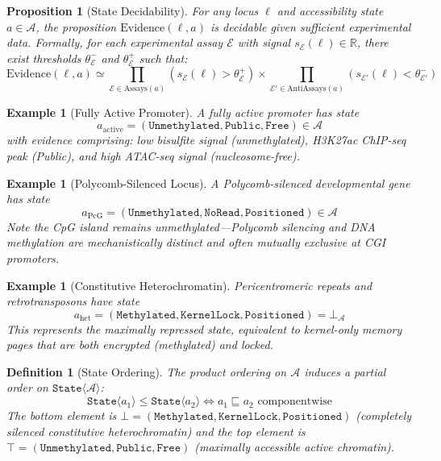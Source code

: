 \documentclass[12pt,a4paper]{article}
\newtheorem{proposition}[theorem]{Proposition}
\newtheorem{definition}[theorem]{Definition}
\newtheorem{example}[theorem]{Example}
\newcommand{\Meth}{\texttt{Methylated}}
\newcommand{\Unmeth}{\texttt{Unmethylated}}
\newcommand{\StateT}{\texttt{State}}
\begin{document}
\begin{proposition}[State Decidability]
\label{prop:state-decide}
For any locus $\ell$ and accessibility state $a \in \mathcal{A}$, the proposition $\mathrm{Evidence}(\ell, a)$ is decidable given sufficient experimental data. Formally, for each experimental assay $\mathcal{E}$ with signal $s_{\mathcal{E}}(\ell) \in \mathbb{R}$, there exist thresholds $\theta_{\mathcal{E}}^-$ and $\theta_{\mathcal{E}}^+$ such that:
\[
    \mathrm{Evidence}(\ell, a) \simeq \prod_{\mathcal{E} \in \mathrm{Assays}(a)} \left(s_{\mathcal{E}}(\ell) > \theta_{\mathcal{E}}^+\right) \times \prod_{\mathcal{E}' \in \mathrm{AntiAssays}(a)} \left(s_{\mathcal{E}'}(\ell) < \theta_{\mathcal{E}'}^-\right)
\]
\end{proposition}

\begin{example}[Fully Active Promoter]
A fully active promoter has state
\[
    a_{\mathrm{active}} = (\Unmeth, \texttt{Public}, \texttt{Free}) \in \mathcal{A}
\]
with evidence comprising: low bisulfite signal (unmethylated), H3K27ac ChIP-seq peak (Public), and high ATAC-seq signal (nucleosome-free).
\end{example}

\begin{example}[Polycomb-Silenced Locus]
A Polycomb-silenced developmental gene has state
\[
    a_{\mathrm{PcG}} = (\Unmeth, \texttt{NoRead}, \texttt{Positioned}) \in \mathcal{A}
\]
Note the CpG island remains unmethylated---Polycomb silencing and DNA methylation are mechanistically distinct and often mutually exclusive at CGI promoters.
\end{example}

\begin{example}[Constitutive Heterochromatin]
Pericentromeric repeats and retrotransposons have state
\[
    a_{\mathrm{het}} = (\Meth, \texttt{KernelLock}, \texttt{Positioned}) = \bot_{\mathcal{A}}
\]
This represents the maximally repressed state, equivalent to kernel-only memory pages that are both encrypted (methylated) and locked.
\end{example}

\begin{definition}[State Ordering]
\label{def:state-ordering}
The product ordering on $\mathcal{A}$ induces a partial order on $\StateT\langle\mathcal{A}\rangle$:
\[
    \StateT\langle a_1 \rangle \leq \StateT\langle a_2 \rangle \iff a_1 \sqsubseteq a_2 \text{ componentwise}
\]
The bottom element is $\bot = (\Meth, \texttt{KernelLock}, \texttt{Positioned})$ (completely silenced constitutive heterochromatin) and the top element is $\top = (\Unmeth, \texttt{Public}, \texttt{Free})$ (maximally accessible active chromatin).
\end{definition}
\end{document}
